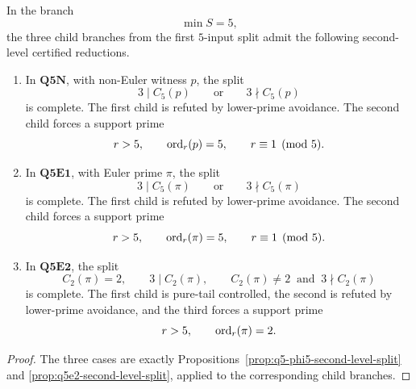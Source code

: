 \begin{corollary}[Certified second-level reduction in the \(q=5\) branch]
\label{cor:q5-second-level-forced-reduction}
In the branch
\[
  \min S=5,
\]
the three child branches from the first \(5\)-input split admit the following
second-level certified reductions.

\begin{enumerate}[label=(\roman*),leftmargin=2.2em]

\item In \(\mathbf{Q5N}\), with non-Euler witness \(p\), the split
      \[
        3\mid C_5(p)
        \qquad\text{or}\qquad
        3\nmid C_5(p)
      \]
      is complete.  The first child is refuted by lower-prime avoidance.  The
      second child forces a support prime
      \[
        r>5,
        \qquad
        \operatorname{ord}_r(p)=5,
        \qquad
        r\equiv1\pmod5.
      \]

\item In \(\mathbf{Q5E1}\), with Euler prime \(\pi\), the split
      \[
        3\mid C_5(\pi)
        \qquad\text{or}\qquad
        3\nmid C_5(\pi)
      \]
      is complete.  The first child is refuted by lower-prime avoidance.  The
      second child forces a support prime
      \[
        r>5,
        \qquad
        \operatorname{ord}_r(\pi)=5,
        \qquad
        r\equiv1\pmod5.
      \]

\item In \(\mathbf{Q5E2}\), the split
      \[
        C_2(\pi)=2,
        \qquad
        3\mid C_2(\pi),
        \qquad
        C_2(\pi)\ne2\ \text{ and }\ 3\nmid C_2(\pi)
      \]
      is complete.  The first child is pure-tail controlled, the second is
      refuted by lower-prime avoidance, and the third forces a support prime
      \[
        r>5,
        \qquad
        \operatorname{ord}_r(\pi)=2.
      \]
\end{enumerate}
\end{corollary}

\begin{proof}
The three cases are exactly Propositions~\ref{prop:q5-phi5-second-level-split}
and \ref{prop:q5e2-second-level-split}, applied to the corresponding child
branches.
\end{proof}


